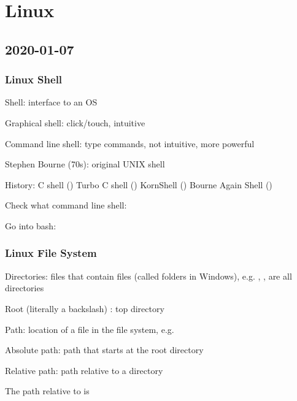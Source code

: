 \chapter{Linux}
\section{2020-01-07}

\subsection{Linux Shell}

Shell: interface to an OS

Graphical shell: click/touch, intuitive

Command line shell: type commands, not intuitive, more powerful

Stephen Bourne (70s): original UNIX shell

History: C shell () \textrightarrow{} Turbo C shell () \textrightarrow{}
KornShell () \textrightarrow{} Bourne Again Shell ()

Check what command line shell: 

Go into bash: 

\subsection{Linux File System}
Directories: files that contain files (called folders in Windows), e.g.
, ,  are all directories

Root (literally a backslash) \code{/}: top directory

Path: location of a file in the file system, e.g. 

Absolute path: path that starts at the root directory

Relative path: path relative to a directory

The path 
relative to  is 

